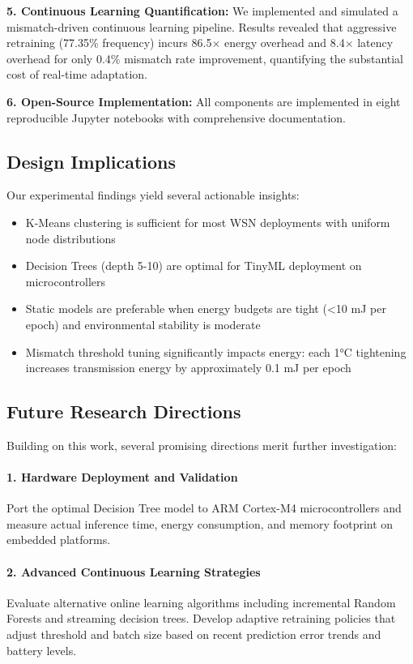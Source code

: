 \documentclass[12pt,a4paper]{article}
\begin{document}
\textbf{5. Continuous Learning Quantification:} We implemented and simulated a mismatch-driven continuous learning pipeline. Results revealed that aggressive retraining (77.35\% frequency) incurs 86.5$\times$ energy overhead and 8.4$\times$ latency overhead for only 0.4\% mismatch rate improvement, quantifying the substantial cost of real-time adaptation.

\textbf{6. Open-Source Implementation:} All components are implemented in eight reproducible Jupyter notebooks with comprehensive documentation.

\subsection{Design Implications}

Our experimental findings yield several actionable insights:
\begin{itemize}
    \item K-Means clustering is sufficient for most WSN deployments with uniform node distributions
    \item Decision Trees (depth 5-10) are optimal for TinyML deployment on microcontrollers
    \item Static models are preferable when energy budgets are tight (<10 mJ per epoch) and environmental stability is moderate
    \item Mismatch threshold tuning significantly impacts energy: each 1°C tightening increases transmission energy by approximately 0.1 mJ per epoch
\end{itemize}

\subsection{Future Research Directions}

Building on this work, several promising directions merit further investigation:

\paragraph{1. Hardware Deployment and Validation}
Port the optimal Decision Tree model to ARM Cortex-M4 microcontrollers and measure actual inference time, energy consumption, and memory footprint on embedded platforms.

\paragraph{2. Advanced Continuous Learning Strategies}
Evaluate alternative online learning algorithms including incremental Random Forests and streaming decision trees. Develop adaptive retraining policies that adjust threshold and batch size based on recent prediction error trends and battery levels.
\end{document}

